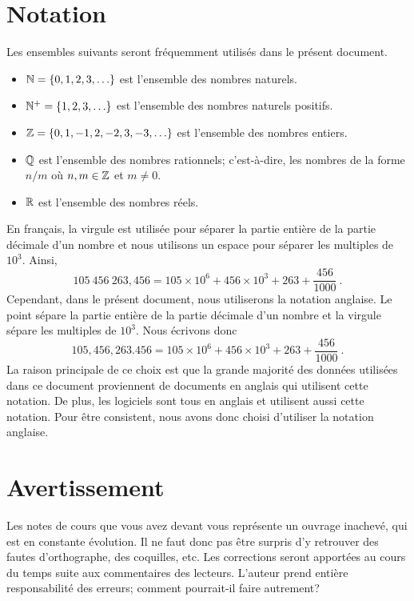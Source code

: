 \section*{Notation}

\begin{defn*}
Les ensembles suivants seront fréquemment utilisés dans le présent
document.
\begin{itemize}
\item $\mathbb{N} = \{0,1,2,3,\ldots \}$ est l'ensemble des nombres naturels.
\item $\mathbb{N}^+ = \{1,2,3,\ldots \}$ est l'ensemble des nombres naturels
positifs.
\item $\mathbb{Z} = \{0,1,-1,2,-2,3,-3, \ldots \}$ est l'ensemble des nombres
entiers.
\item $\mathbb{Q}$ est l'ensemble des nombres rationnels; c'est-à-dire, les
  nombres de la forme $n/m$ où $n,m \in \mathbb{Z}$ et $m \neq 0$.
\item $\mathbb{R}$ est l'ensemble des nombres réels.
\end{itemize}
\end{defn*}

En français, la virgule est utilisée pour séparer la partie entière de
la partie décimale d'un nombre et nous utilisons un espace pour séparer
les multiples de $10^3$.  Ainsi,
\[
105\ 456\ 263,456 =
105\times 10^6+ 456\times 10^3 + 263 + \frac{456}{1000} \ .
\]
Cependant, dans le présent document, nous utiliserons la notation
anglaise.  Le point sépare la partie entière de la partie décimale d'un
nombre et la virgule sépare les multiples de $10^3$.  Nous écrivons donc
\[
105,456,263.456 = 105\times 10^6+ 456\times 10^3 + 263 + \frac{456}{1000} \ .
\]
La raison principale de ce choix est que la grande majorité des
données utilisées dans ce document proviennent de documents en anglais
qui utilisent cette notation.  De plus, les logiciels sont tous en
anglais et utilisent aussi cette notation.  Pour être consistent, nous
avons donc choisi d'utiliser la notation anglaise.

\section*{Avertissement}

Les notes de cours que vous avez devant vous représente un ouvrage
inachevé, qui est en constante évolution.  Il ne faut donc pas être
surpris d'y retrouver des fautes d'orthographe, des coquilles, etc.
Les corrections seront apportées au cours du temps suite aux
commentaires des lecteurs.  L'auteur prend entière responsabilité
des erreurs; comment pourrait-il faire autrement?

